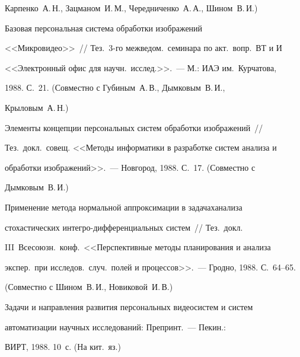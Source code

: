 Карпенко~А.\,Н., Зацманом~И.\,М., Чередниченко~А.\,А., Шином~В.\,И.)


\vspace*{-1.2pt}





 Базовая персональная система обработки изображений


<<Микровидео>>~// Тез.\ 3-го межведом.\ семинара по акт.\ вопр.\ ВТ и И


<<Электронный офис для научн.\ исслед.>>.~--- М.: ИАЭ им.~Курчатова,


1988. С.~21. (Совместно с Губиным~А.\,В., Дым\-ко\-вым~В.\,И.,


Крыловым~А.\,Н.)


\vspace*{-1.2pt}





 Элементы концепции персональных систем обработки изображений~//


Тез.\ докл.\ совещ. <<Методы информатики в разработке систем анализа и


обработки изображений>>.~--- Новгород, 1988. С.~17. (Совместно с


Дымковым~В.\,И.)


\vspace*{-1.2pt}





 Применение метода нормальной аппроксимации в задачах\linebreak анализа


стохастических интегро-дифференциальных систем~// Тез.\ докл.\


III~Всесоюзн.\ конф.\ <<Перспективные методы планирования и анализа


экспер.\ при исследов.\ случ.\ полей и процессов>>.~--- Гродно, 1988. С.~64--65.


(Совместно с Шином~В.\,И., Новиковой~И.\,В.)


\vspace*{-1.2pt}





 Задачи и направления развития персональных видеосистем и систем


автоматизации научных исследований: Препринт.~--- Пекин.:


ВИРТ, 1988. 10~с. (На кит.\ яз.)


\vspace*{-3pt}






